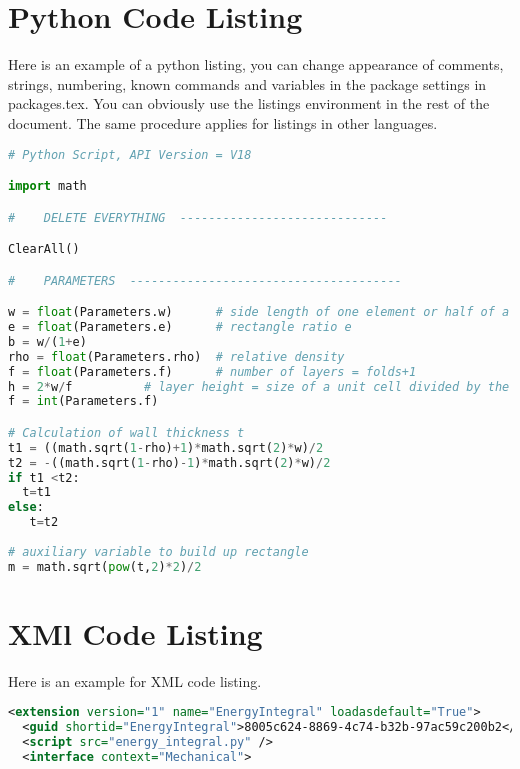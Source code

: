 \begin{appendix}
\addappheadtotoc
\section{Python Code Listing}
\label{app_a}

Here is an example of a python listing, you can change appearance of comments, strings, numbering, known commands and variables in the package settings in packages.tex. You can obviously use the listings environment in the rest of the document. The same procedure applies for listings in other languages.


\vfill

\begin{lstlisting}[language=Python, title=Python Listing Title]
# Python Script, API Version = V18

import math

#    DELETE EVERYTHING  -----------------------------

ClearAll()

#    PARAMETERS  --------------------------------------

w = float(Parameters.w)      # side length of one element or half of a unit cell
e = float(Parameters.e)      # rectangle ratio e
b = w/(1+e)               
rho = float(Parameters.rho)  # relative density
f = float(Parameters.f)      # number of layers = folds+1
h = 2*w/f          # layer height = size of a unit cell divided by the number of layers
f = int(Parameters.f)

# Calculation of wall thickness t
t1 = ((math.sqrt(1-rho)+1)*math.sqrt(2)*w)/2
t2 = -((math.sqrt(1-rho)-1)*math.sqrt(2)*w)/2
if t1 <t2:
  t=t1
else:
   t=t2
   
# auxiliary variable to build up rectangle
m = math.sqrt(pow(t,2)*2)/2

\end{lstlisting}


\vfill

\pagebreak


\section{XMl Code Listing}
Here is an example for XML code listing.
\vfill

\begin{lstlisting}[language=XML, title=XML Listing Title]
<extension version="1" name="EnergyIntegral" loadasdefault="True">
  <guid shortid="EnergyIntegral">8005c624-8869-4c74-b32b-97ac59c200b2</guid>                                  
  <script src="energy_integral.py" />
  <interface context="Mechanical">
\end{lstlisting}


\end{appendix}
